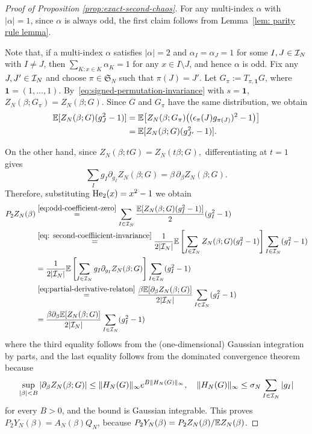 \documentclass[../CLT_SYK.tex]{subfiles}
\begin{document}
\begin{proof}[{Proof { of Proposition \ref{prop:exact-second-chaos}}}]
For {any} multi-index $\alpha$ with $|\alpha|=1$, since $\alpha$ is always odd, the first claim follows from Lemma~\ref{lem: parity rule lemma}. 

{Note that, if a multi-index $\alpha$ satisfies $|\alpha|=2$ and $\alpha_I=\alpha_J=1$ for some $I,J\in\mathcal I_N$ with $I\ne J$, then $\sum_{K: x\in K} \alpha_K=1$ for any $x\in I\setminus J$, and hence $\alpha$ is odd.
Fix any $J,J'\in\mathcal I_N$ and choose $\pi\in\mathfrak S_N$
such that $\pi(J)=J'$.
Let $G_\pi:=T_{\pi,\mathbf 1}G$, where $\mathbf 1=(1,\ldots,1)$.
By~\eqref{eq:signed-permutation-invariance} with $s=\mathbf 1$,
$Z_N(\beta;G_\pi)=Z_N(\beta;G)$.
Since $G$ and $G_\pi$ have the same distribution, we obtain
\begin{align}\label{eq: second-coeffiicient-invariance}
  \mathbb E[Z_N(\beta;G)(g_J^2-1)]
  &=\mathbb E\!\left[Z_N(\beta;G_\pi)
    \bigl((\epsilon_\pi(J)g_{\pi(J)})^2-1\bigr)\right]\notag\\
  &=\mathbb E[Z_N(\beta;G)(g_{J'}^2-1)].
\end{align}}

On the other hand,  since $
  Z_N(\beta;tG)
  =Z_N(t\beta;G),
$ 
 differentiating at $t=1$ gives
 \begin{equation}\label{eq:partial-derivative-relaton}
 \sum_Ig_I\partial_{g_I}Z_N(\beta;G)
=\beta\,\partial_\beta Z_N(\beta;G).
 \end{equation}
{Therefore, substituting ${\rm He}_2(x)=x^2-1$ we obtain
\begin{align*}
	P_2Z_N(\beta)&\overset{\eqref{eq:odd-coefficient-zero}}{=}\sum_{I\in\mathcal I_N}\frac{\mathbb E[Z_N(\beta;G)(g_I^2-1)]}{2}(g_I^2-1)\\
	&\overset{\eqref{eq: second-coeffiicient-invariance}}{=}\frac{1}{2|\mathcal I_N|}\mathbb E\left[\sum_{I\in\mathcal I_N}Z_N(\beta;G)(g_I^2-1)\right]\sum_{I\in\mathcal I_N}(g_I^2-1)\\
	&=\frac{1}{2|\mathcal I_N|}\mathbb E\left[\sum_{I\in\mathcal I_N}g_I\partial_{g_I}Z_N(\beta;G)\right]\sum_{I\in\mathcal I_N}(g_I^2-1)\\
	&\overset{\eqref{eq:partial-derivative-relaton}}{=}\frac{\beta\mathbb E[\partial_\beta Z_N(\beta;G)]}{2|\mathcal I_N|}\sum_{I\in\mathcal I_N}(g_I^2-1)\\
	&=\frac{\beta\partial_\beta\mathbb E[ Z_N(\beta;G)]}{2|\mathcal I_N|}\sum_{I\in\mathcal I_N}(g_I^2-1)
\end{align*}
where the third equality follows from the (one-dimensional) Gaussian integration by parts, and the last equality follows from the dominated convergence theorem because
\[\sup_{|\beta|<B}|\partial_\beta Z_N(\beta;G)|\le \|H_N(G)\|_\infty e^{B\|H_N(G)\|_\infty},\quad  \|H_N(G)\|_\infty\le \sigma_N\sum_{I\in\mathcal I_N}|g_I|\]
for every $B>0$, and the bound is Gaussian integrable.} 
This proves {$P_2 Y_N(\beta)
	=A_N(\beta)Q_N$, because $P_2Y_N(\beta)=P_2Z_N(\beta)/\mathbb E Z_N(\beta)$}.
\end{proof}
\end{document}
